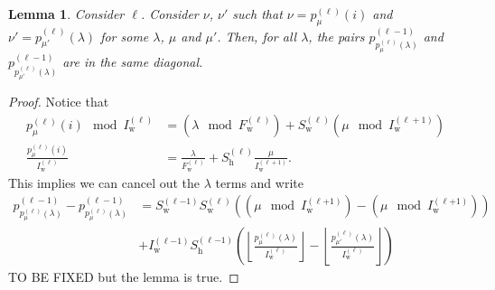 \documentclass{article} %
\newcommand{\bracket}[3]{{\left#1 #3 \right#2}}
\newcommand{\bra}{\bracket{(}{)}}
\newcommand{\floor}{\bracket{\lfloor}{\rfloor}}
\newcommand{\ssup}[1]{^\bra{#1}}
\newtheorem{lemma}[theorem]{Lemma}
\begin{document}
\begin{lemma}
  Consider $\ell$. Consider $\nu$, $\nu'$ such that
  $\nu=p\ssup{\ell}_{\mu}(i)$ and $\nu'=p\ssup{\ell}_{\mu'}(\lambda)$ for some
  $\lambda$, $\mu$ and $\mu'$. Then, for all $\lambda$, the pairs
  $p\ssup{\ell-1}_{p\ssup{\ell}_\mu(\lambda)}$ and
  $p\ssup{\ell-1}_{p\ssup{\ell}_{\mu'}(\lambda)}$ are in the same diagonal.
\end{lemma}
\begin{proof}
  Notice that
  \begin{align}
    p\ssup{\ell}_\mu(i) \mod I\ssup{\ell}_\text{w} &= \bra{\lambda \mod F\ssup{\ell}_\text{w}} + S\ssup{\ell}_\text{w}\bra{\mu\mod I\ssup{\ell+1}_\text{w}} \\
    \frac{p\ssup{\ell}_\mu(i)}{I\ssup{\ell}_\text{w}} &= \frac{\lambda}{F\ssup{\ell}_\text{w}} + S\ssup{\ell}_\text{h} \frac{\mu}{I\ssup{\ell+1}_\text{w}}.
  \end{align}
  This implies we can cancel out the $\lambda$ terms and write
{
  \newcommand{\p}[2]{{p\ssup{\ell{#1}}_{\mu{#2}}(\lambda)}}
  \newcommand{\Iw}[1]{{I\ssup{\ell{#1}}_\text{w}}}
  \newcommand{\Ih}[1]{{I\ssup{\ell{#1}}_\text{h}}}
  \newcommand{\Sw}[1]{{S\ssup{\ell{#1}}_\text{w}}}
  \newcommand{\Sh}[1]{{S\ssup{\ell{#1}}_\text{h}}}
  \begin{align*}
    p\ssup{\ell-1}_\p{}{} -   p\ssup{\ell-1}_{\p{}{}} &=
\Sw{-1}\Sw{} \bra{\bra{\mu \mod \Iw{+1}} - \bra{\mu \mod \Iw{+1}}} \\
&+ \Iw{-1}\Sh{-1} \bra{\floor{\frac{\p{}{}}{\Iw{}}} - \floor{\frac{\p{}{'}}{\Iw{}}}}
  \end{align*}
  }
  TO BE FIXED but the lemma is true.
\end{proof}



\end{document}
